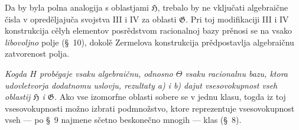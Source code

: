 \documentclass[11pt]{article}
\begin{document}
Da by byla polna analogija s oblastjami $\mathfrak H$, trebalo by ne vključati algebraične čisla v opreděljajuča svojstva III i IV za oblasti $\mathfrak G$. Pri toj modifikaciji III i IV konstrukcija cělyh elementov posrědstvom racionalnoj bazy prěnosi se na vsako {\itshape libovoljno} polje (\S\ 10), dokolě Zermelova konstrukcija prědpostavlja algebraičnu zatvorenost polja.

{\itshape Kogda $H$ proběgaje vsaku algebraičnu, odnosno $\Theta$ vsaku racionalnu bazu, ktora udovletvorja dodatnomu uslovju, rezultaty a) i b) dajut vsesovokupnost vseh oblastij $\mathfrak H$ i $\mathfrak G$.} Ako vse izomorfne oblasti sobere se v jednu klasu, togda iz toj vsesovokupnosti možno izbrati podmnožstvo, ktore reprezentuje vsesovokupnost vseh --- po \S\ 9 najmene sčetno beskonečno mnogih --- klas (\S\ 8).
\end{document}
